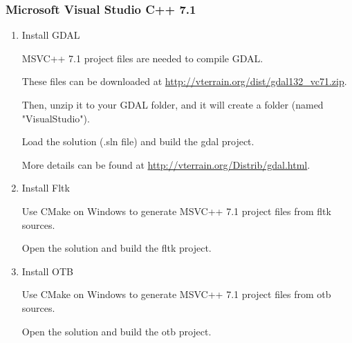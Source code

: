 \subsubsection{Microsoft Visual Studio C++ 7.1}
\begin{enumerate}
\item Install GDAL

	MSVC++ 7.1 project files are needed to compile GDAL.
	
	These files can be downloaded at \url{http://vterrain.org/dist/gdal132_vc71.zip}.
	
	Then, unzip it to your GDAL folder, and it will create a folder (named "VisualStudio").
	
	Load the solution (.sln file) and build the gdal project.
	
	More details can be found at \url{http://vterrain.org/Distrib/gdal.html}.

\item Install Fltk

	Use CMake on Windows to generate MSVC++ 7.1 project files from fltk sources.
	
	Open the solution and build the fltk project.

\item Install OTB

	Use CMake on Windows to generate MSVC++ 7.1 project files from otb sources.
	
	Open the solution and build the otb project.

\end{enumerate}

